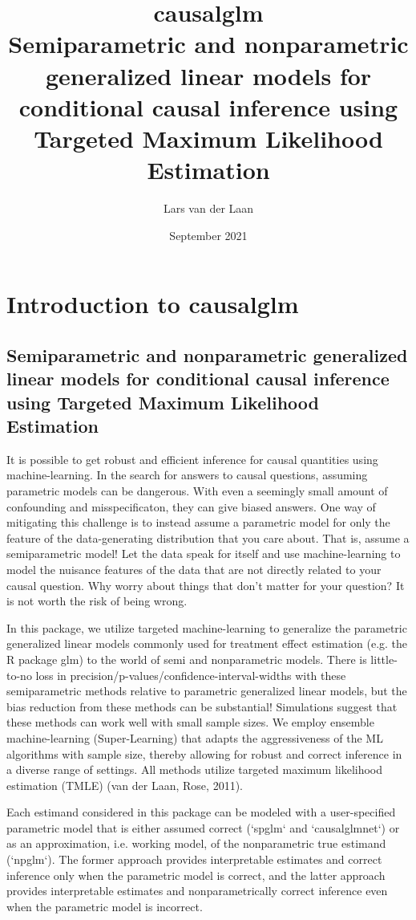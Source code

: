 \documentclass{article}
\title{%
  causalglm \\
  \large Semiparametric and nonparametric generalized linear models for conditional causal inference using Targeted Maximum Likelihood Estimation
  }
\author{Lars van der Laan }
\date{September 2021}
\begin{document}


\maketitle



\section{Introduction to causalglm}
\subsection{Semiparametric and nonparametric generalized linear models for conditional causal inference using Targeted Maximum Likelihood Estimation}


It is possible to get robust and efficient inference for causal quantities using machine-learning. In the search for answers to causal questions, assuming parametric models can be dangerous. With even a seemingly small amount of confounding and misspecificaton, they can give biased answers. One way of mitigating this challenge is to instead assume a parametric model for only the feature of the data-generating distribution that you care about. That is, assume a semiparametric model! Let the data speak for itself and use machine-learning to model the nuisance features of the data that are not directly related to your causal question. Why worry about things that don't matter for your question? It is not worth the risk of being wrong.

In this package, we utilize targeted machine-learning to generalize the parametric generalized linear models commonly used for treatment effect estimation (e.g. the R package glm) to the world of semi and nonparametric models. There is little-to-no loss in precision/p-values/confidence-interval-widths with these semiparametric methods relative to parametric generalized linear models, but the bias reduction from these methods can be substantial! Simulations suggest that these methods can work well with small sample sizes. We employ ensemble machine-learning (Super-Learning) that adapts the aggressiveness of the ML algorithms with sample size, thereby allowing for robust and correct inference in a diverse range of settings. All methods utilize targeted maximum likelihood estimation (TMLE) (van der Laan, Rose, 2011).\nocite{vanderLaanRose2011}

Each estimand considered in this package can be modeled with a user-specified parametric model that is either assumed correct (`spglm` and `causalglmnet`) or as an approximation, i.e. working model, of the nonparametric true estimand (`npglm`). The former approach provides interpretable estimates and correct inference only when the parametric model is correct, and the latter approach provides interpretable estimates and nonparametrically correct inference even when the parametric model is incorrect.
\end{document}
